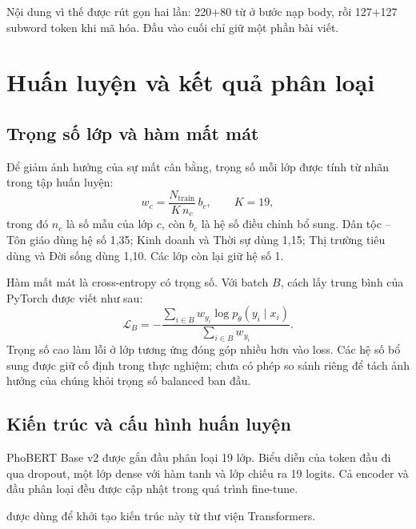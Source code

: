Nội dung vì thế được rút gọn hai lần: 220+80 từ ở bước nạp body, rồi 127+127 subword token khi mã hóa. Đầu vào cuối chỉ giữ một phần bài viết.

\chapter{Huấn luyện và kết quả phân loại}
\section{Trọng số lớp và hàm mất mát}
Để giảm ảnh hưởng của sự mất cân bằng, trọng số mỗi lớp được tính từ nhãn trong tập huấn luyện:
\[
w_c=\frac{N_{\mathrm{train}}}{K\,n_c}\,b_c,\qquad K=19,
\]
trong đó $n_c$ là số mẫu của lớp $c$, còn $b_c$ là hệ số điều chỉnh bổ sung. Dân tộc -- Tôn giáo dùng hệ số 1,35; Kinh doanh và Thời sự dùng 1,15; Thị trường tiêu dùng và Đời sống dùng 1,10. Các lớp còn lại giữ hệ số 1.

Hàm mất mát là cross-entropy có trọng số. Với batch $B$, cách lấy trung bình của PyTorch được viết như sau:
\[
\mathcal{L}_B=-\frac{\sum_{i\in B}w_{y_i}\log p_\theta(y_i\mid x_i)}{\sum_{i\in B}w_{y_i}}.
\]
Trọng số cao làm lỗi ở lớp tương ứng đóng góp nhiều hơn vào loss. Các hệ số bổ sung được giữ cố định trong thực nghiệm; chưa có phép so sánh riêng để tách ảnh hưởng của chúng khỏi trọng số balanced ban đầu.

\section{Kiến trúc và cấu hình huấn luyện}
PhoBERT Base v2 được gắn đầu phân loại 19 lớp. Biểu diễn của token đầu đi qua dropout, một lớp dense với hàm tanh và lớp chiếu ra 19 logits. Cả encoder và đầu phân loại đều được cập nhật trong quá trình fine-tune.

 được dùng để khởi tạo kiến trúc này từ thư viện Transformers.

